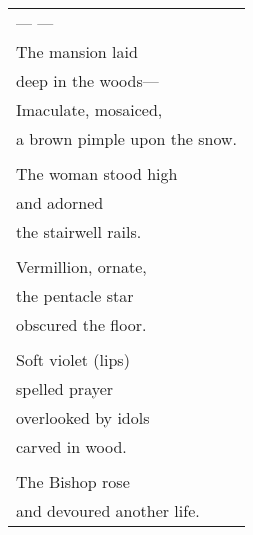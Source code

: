 \documentclass{article}
\begin{document}
\begin{tabular}{l}
\\
--- --- \\
The mansion laid \\
deep in the woods--- \\
Imaculate, mosaiced, \\
a brown pimple upon the snow. \\
\\
The woman stood high \\
and adorned \\
the stairwell rails. \\
\\
Vermillion, ornate, \\
the pentacle star \\
obscured the floor. \\
\\
Soft violet (lips) \\
spelled prayer \\
overlooked by idols \\
carved in wood. \\
\\
The Bishop rose \\
and devoured another life. \\
\end{tabular} \\
\end{document}
